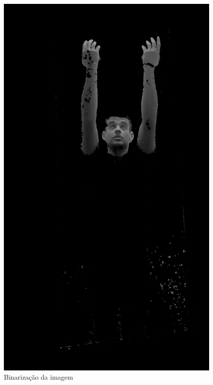 \begin{figure}[H]
    \centering
    \caption{Binarização da imagem}
        \begin{minipage}{\sizeImg\textwidth}
            \includegraphics[width=\textwidth]{figuras/mao_barra/gray.png}
        \end{minipage}
        \begin{minipage}{\sizeImg\textwidth}

\end{minipage}
\end{figure}
